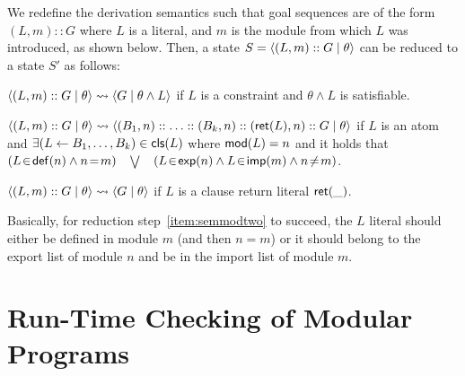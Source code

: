 \documentclass{llncs}
\newcommand{\finalcompression}[1]{\vspace*{#1}}
\begin{document}
  \begin{definition}
  \label{def:oper-sem-mod}
    We redefine the derivation semantics such that goal sequences are
    of the form $(L,m)::G$ where $L$ is a literal, and $m$ is the
    module from which $L$ was introduced, as shown below.
    Then, a state $S = \langle (L,m)::G \mid{} \theta \rangle$ can be reduced to a state
    $S'$ as follows:
        \finalcompression{-1mm}
    \begin{shortenumerate}
    \item $\langle (L,m)::G \mid{} \theta \rangle \leadsto \langle G \mid{} \theta \land L \rangle$
          if $L$ is a constraint and $\theta \land L$ is satisfiable.
    \item $\reduction{\state{(L,m)::G}{\theta}}%
                     {\state{(B_1,n)::\ldots::(B_k,n)::(\ret{L},n)::G}{\theta}}$
          if $L$ is an atom and
          $\exists (L \leftarrow B_1, \ldots, B_k) \in \mathsf{cls}(L)$
          where $\mathsf{mod}(L)=n$ and it holds that
          $(L\!\in\!\mathsf{def}(n) \land n\!=\!m)$%
          ~$\bigvee$~%
          $(L\!\in\!\mathsf{exp}(n) \land L\!\in\!\mathsf{imp}(m) \land n\!\neq\!m)$.%
          \label{item:semmodtwo}
    \item $\reduction{\state{(L,m)::G}{\theta}}%
                     {\state{G}{\theta}}$
          if $L$ is a clause return literal $\textsf{ret}(\_)$.
    \end{shortenumerate}
  \end{definition}

  Basically, for reduction step~\ref{item:semmodtwo} to succeed, the
  $L$ literal should either be defined in module $m$ (and then
  $n = m$) or it should belong to the export list of module $n$ and be
  in the import list of module $m$.



\section{Run-Time Checking of Modular Programs}
\label{mod-rtchecks}
\end{document}
